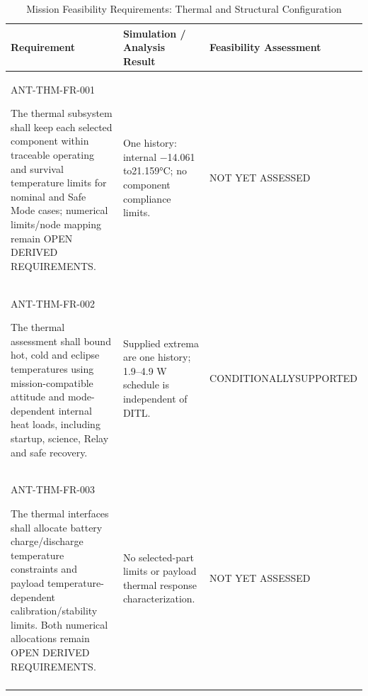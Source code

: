 \begin{table}[H]\centering\small\setlength{\tabcolsep}{3pt}
\caption{Mission Feasibility Requirements: Thermal and Structural Configuration}\label{tab:fr-thermal_structural}
\begin{tabular}{@{}
>{\RaggedRight\arraybackslash}p{}
>{\RaggedRight\arraybackslash}p{}
>{\RaggedRight\arraybackslash}p{}
@{}}
\toprule Requirement & Simulation / Analysis Result & Feasibility Assessment\\\midrule
{}\label{req:ANT-THM-FR-001}\mbox{ANT-THM-}\newline\mbox{FR-001}\par The thermal subsystem shall keep each selected component within traceable operating and survival temperature limits for nominal and Safe Mode cases; numerical limits/node mapping remain OPEN DERIVED REQUIREMENTS. & One history: internal −14.061 to21.159°C; no component compliance limits. & NOT YET ASSESSED\\
\addlinespace[3pt]
\label{req:ANT-THM-FR-002}\mbox{ANT-THM-}\newline\mbox{FR-002}\par The thermal assessment shall bound hot, cold and eclipse temperatures using mission-compatible attitude and mode-dependent internal heat loads, including startup, science, Relay and safe recovery. & Supplied extrema are one history; 1.9–4.9 W schedule is independent of DITL. & CONDITIONALLY\newline SUPPORTED\\
\addlinespace[3pt]
\label{req:ANT-THM-FR-003}\mbox{ANT-THM-}\newline\mbox{FR-003}\par The thermal interfaces shall allocate battery charge/discharge temperature constraints and payload temperature-dependent calibration/stability limits. Both numerical allocations remain OPEN DERIVED REQUIREMENTS. & No selected-part limits or payload thermal response characterization. & NOT YET ASSESSED\\
\addlinespace[3pt]
\bottomrule
\end{tabular}
\end{table}
